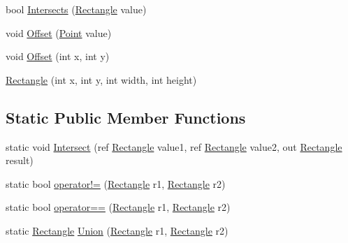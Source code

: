 \begin{DoxyCompactItemize}
\item 
bool \hyperlink{structMicrosoft_1_1Xna_1_1Framework_1_1Rectangle_a784e160e258c8ed64265b13aaf28304a}{Intersects} (\hyperlink{structMicrosoft_1_1Xna_1_1Framework_1_1Rectangle}{Rectangle} value)
\item 
void \hyperlink{structMicrosoft_1_1Xna_1_1Framework_1_1Rectangle_abc775537b45bc37445d832782bcf9329}{Offset} (\hyperlink{structMicrosoft_1_1Xna_1_1Framework_1_1Point}{Point} value)
\item 
void \hyperlink{structMicrosoft_1_1Xna_1_1Framework_1_1Rectangle_a810fcd6a50d3ca055eb6c4aa6c4db113}{Offset} (int x, int y)
\item 
\hyperlink{structMicrosoft_1_1Xna_1_1Framework_1_1Rectangle_a05b3fee96f4cb13fec08235010ed9c33}{Rectangle} (int x, int y, int width, int height)
\end{DoxyCompactItemize}
\subsection*{Static Public Member Functions}
\begin{DoxyCompactItemize}
\item 
static void \hyperlink{structMicrosoft_1_1Xna_1_1Framework_1_1Rectangle_a4370022d341284fa98cc3eabca160409}{Intersect} (ref \hyperlink{structMicrosoft_1_1Xna_1_1Framework_1_1Rectangle}{Rectangle} value1, ref \hyperlink{structMicrosoft_1_1Xna_1_1Framework_1_1Rectangle}{Rectangle} value2, out \hyperlink{structMicrosoft_1_1Xna_1_1Framework_1_1Rectangle}{Rectangle} result)
\item 
static bool \hyperlink{structMicrosoft_1_1Xna_1_1Framework_1_1Rectangle_af95e1940ec72e0ef5ac586ce1abb2cea}{operator!=} (\hyperlink{structMicrosoft_1_1Xna_1_1Framework_1_1Rectangle}{Rectangle} r1, \hyperlink{structMicrosoft_1_1Xna_1_1Framework_1_1Rectangle}{Rectangle} r2)
\item 
static bool \hyperlink{structMicrosoft_1_1Xna_1_1Framework_1_1Rectangle_a1331c9c6f145762a42eec8ea99054991}{operator==} (\hyperlink{structMicrosoft_1_1Xna_1_1Framework_1_1Rectangle}{Rectangle} r1, \hyperlink{structMicrosoft_1_1Xna_1_1Framework_1_1Rectangle}{Rectangle} r2)
\item 
static \hyperlink{structMicrosoft_1_1Xna_1_1Framework_1_1Rectangle}{Rectangle} \hyperlink{structMicrosoft_1_1Xna_1_1Framework_1_1Rectangle_a4ca9dafb79b94fed2826d27cdd8405d2}{Union} (\hyperlink{structMicrosoft_1_1Xna_1_1Framework_1_1Rectangle}{Rectangle} r1, \hyperlink{structMicrosoft_1_1Xna_1_1Framework_1_1Rectangle}{Rectangle} r2)
\end{DoxyCompactItemize}
